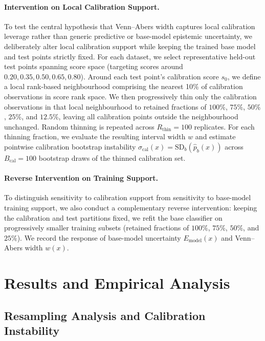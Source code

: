 \documentclass[11pt]{article}
\begin{document}
	\paragraph{Intervention on Local Calibration Support.}
	To test the central hypothesis that Venn--Abers width captures local calibration leverage rather than generic predictive or base-model epistemic uncertainty, we deliberately alter local calibration support while keeping the trained base model and test points strictly fixed. 
	For each dataset, we select representative held-out test points spanning score space (targeting scores around $0.20, 0.35, 0.50, 0.65, 0.80$). Around each test point's calibration score $s_0$, we define a local rank-based neighbourhood comprising the nearest 10\% of calibration observations in score rank space.
	We then progressively thin only the calibration observations in that local neighbourhood to retained fractions of $100\%$, $75\%$, $50\%$, $25\%$, and $12.5\%$, leaving all calibration points outside the neighbourhood unchanged. Random thinning is repeated across $R_{\mathrm{thin}} = 100$ replicates. For each thinning fraction, we evaluate the resulting interval width $w$ and estimate pointwise calibration bootstrap instability $\sigma_{\mathrm{cal}}(x) = \mathrm{SD}_b(\hat p_b(x))$ across $B_{\mathrm{cal}} = 100$ bootstrap draws of the thinned calibration set.

	\paragraph{Reverse Intervention on Training Support.}
	To distinguish sensitivity to calibration support from sensitivity to base-model training support, we also conduct a complementary reverse intervention: keeping the calibration and test partitions fixed, we refit the base classifier on progressively smaller training subsets (retained fractions of $100\%$, $75\%$, $50\%$, and $25\%$). We record the response of base-model uncertainty $E_{\mathrm{model}}(x)$ and Venn--Abers width $w(x)$.

	\section{Results and Empirical Analysis}
	\label{sec:results}
	
	\subsection{Resampling Analysis and Calibration Instability}
	
\end{document}
